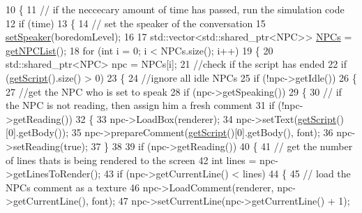 \begin{DoxyCode}
10 \{
11     \textcolor{comment}{// if the neccecary amount of time has passed, run the simulation code}
12     \textcolor{keywordflow}{if} (time)
13     \{
14         \textcolor{comment}{// set the speaker of the conversation}
15         \hyperlink{class_n_p_c___group_a5c1f3d1ad1f50910bb912ed828615ff8}{setSpeaker}(boredomLevel);
16 
17         std::vector<std::shared\_ptr<NPC>> \hyperlink{class_base___group_a4757f3c06c73eea029f71b871c1d863e}{NPCs} = \hyperlink{class_base___group_a75eec9132aaf532b4429e0af76b31775}{getNPCList}();
18         \textcolor{keywordflow}{for} (\textcolor{keywordtype}{int} i = 0; i < NPCs.size(); i++)
19         \{
20             std::shared\_ptr<NPC> npc = NPCs[i];
21             \textcolor{comment}{//check if the script has ended}
22             \textcolor{keywordflow}{if} (\hyperlink{class_base___group_a48dadfbc8cdefca9bdd2c42b99115ad8}{getScript}().size() > 0)
23             \{
24                 \textcolor{comment}{//ignore all idle NPCs}
25                 \textcolor{keywordflow}{if} (!npc->getIdle())
26                 \{
27                     \textcolor{comment}{//get the NPC who is set to speak}
28                     \textcolor{keywordflow}{if} (npc->getSpeaking())
29                     \{
30                         \textcolor{comment}{// if the NPC is not reading, then assign him a fresh comment}
31                         \textcolor{keywordflow}{if} (!npc->getReading())
32                         \{
33                             npc->LoadBox(renderer);
34                             npc->setText(\hyperlink{class_base___group_a48dadfbc8cdefca9bdd2c42b99115ad8}{getScript}()[0].getBody());
35                             npc->prepareComment(\hyperlink{class_base___group_a48dadfbc8cdefca9bdd2c42b99115ad8}{getScript}()[0].getBody(), font);
36                             npc->setReading(\textcolor{keyword}{true});
37                         \}
38 
39                         \textcolor{keywordflow}{if} (npc->getReading())
40                         \{
41                             \textcolor{comment}{// get the number of lines thats is being rendered to the screen}
42                             \textcolor{keywordtype}{int} lines = npc->getLinesToRender();
43                             \textcolor{keywordflow}{if} (npc->getCurrentLine() < lines)
44                             \{
45                                 \textcolor{comment}{// load the NPCs comment as a texture}
46                                 npc->LoadComment(renderer, npc->getCurrentLine(), font);
47                                 npc->setCurrentLine(npc->getCurrentLine() + 1);

\end{DoxyCode}
